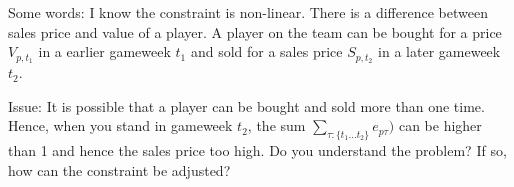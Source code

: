 Some words: I know the constraint is non-linear. There is a difference between sales price and value of a player. A player on the team can be bought for a price $V_{p,t_{1}}$ in a earlier gameweek $t_{1}$ and sold for a sales price $S_{p,t_{2}}$ in a later gameweek $t_{2}$.

\newpar

Issue: It is possible that a player can be bought and sold more than one time. Hence, when you stand in gameweek $t_{2}$, the sum $\sum_{\tau:\{ t_{1} \dots t_{2}\}} e_{p\tau})$ can be higher than 1 and hence the sales price too high. Do you understand the problem? If so, how can the constraint be adjusted? 

\begin{comment}

\subsection{Suggested solution}

\subsubsection{Budget Constraints}

\begin{equation} 
    B^{S} - \sum_{p \in \mathcal{P}} C_{p1}^{B}x_{p1} = v_{1}
\end{equation}

\begin{equation} 
    v_{t_{2}-1} + \sum_{p \in \mathcal{P}}S_{pt_{1}t_{2}}s_{pt_{1}pt_{2}} - \sum_{p \in \mathcal{P}}C_{pt}^{B}e_{pt_{2}} = v_{t_{2}} \qquad\qquad t_{1}, t_{2} \in \mathcal{T}\setminus\{1\}, \quad t_{2} > t_{1}
\end{equation}

\begin{equation}
\sum_{t_{1} < t_{2}} s_{p,t_{1},t_{2}} = u_{pt_{2}}    \qquad\qquad t_{1}, t_{2} \in \mathcal{T}\setminus\{1\} \enskip p \in \mathcal{P}
\end{equation}

\begin{equation}
    \sum_{t_{2} > t_{1}} s_{p,t_{1},t_{2}} \leq e_{p,t_{1}} \qquad\qquad t_{1}, t_{2} \in \mathcal{T}\setminus\{1\}, \enskip p \in \mathcal{P}
\end{equation}

\begin{equation}
    \sum_{t_{A} < t_{1}} \sum_{t_{B}} s_{p,t_{A},t_{B}} -     \sum_{t_{A}} \sum_{t_{B} < t_{1}} s_{p,t_{A},t_{B}} = M(1-e_{pt_{1}}) \quad\quad p \in \mathcal{P}, \enskip t_{1} \in \mathcal{T}
\end{equation}

\begin{equation} 
  x_{p,(t-1)} + e_{pt} - u_{pt} = x_{pt} \qquad\qquad p \in \mathcal{P}, \enskip t \in \mathcal{T}\setminus\{1\} 
\end{equation}

\begin{equation} 
   e_{pt} + u_{pt} \leq 1  \qquad\qquad p \in \mathcal{P}, \enskip t \in \mathcal{T} 
\end{equation}

\end{comment}